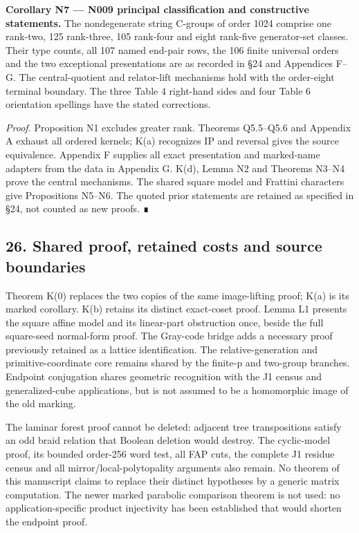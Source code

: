 \documentclass[
  10pt,
  letterpaper,
]{article}
\begin{document}
\textbf{Corollary N7 --- N009 principal classification and constructive
statements.} The nondegenerate string C-groups of order 1024 comprise
one rank-two, 125 rank-three, 105 rank-four and eight rank-five
generator-set classes. Their type counts, all 107 named end-pair rows,
the 106 finite universal orders and the two exceptional presentations
are as recorded in §24 and Appendices F--G. The central-quotient and
relator-lift mechanisms hold with the order-eight terminal boundary. The
three Table 4 right-hand sides and four Table 6 orientation spellings
have the stated corrections.

\emph{Proof.} Proposition N1 excludes greater rank. Theorems Q5.5--Q5.6
and Appendix A exhaust all ordered kernels; K(a) recognizes IP and
reversal gives the source equivalence. Appendix F supplies all exact
presentation and marked-name adapters from the data in Appendix G. K(d),
Lemma N2 and Theorems N3--N4 prove the central mechanisms. The shared
square model and Frattini characters give Propositions N5--N6. The
quoted prior statements are retained as specified in §24, not counted as
new proofs. ∎

\subsection{26. Shared proof, retained costs and source
boundaries}\label{shared-proof-retained-costs-and-source-boundaries}

Theorem K(0) replaces the two copies of the same image-lifting proof;
K(a) is its marked corollary. K(b) retains its distinct exact-coset
proof. Lemma L1 presents the square affine model and its linear-part
obstruction once, beside the full square-seed normal-form proof. The
Gray-code bridge adds a necessary proof previously retained as a lattice
identification. The relative-generation and primitive-coordinate core
remains shared by the finite-p and two-group branches. Endpoint
conjugation shares geometric recognition with the J1 census and
generalized-cube applications, but is not assumed to be a homomorphic
image of the old marking.

The laminar forest proof cannot be deleted: adjacent tree transpositions
satisfy an odd braid relation that Boolean deletion would destroy. The
cyclic-model proof, its bounded order-256 word test, all FAP cuts, the
complete J1 residue census and all mirror/local-polytopality arguments
also remain. No theorem of this manuscript claims to replace their
distinct hypotheses by a generic matrix computation. The newer marked
parabolic comparison theorem is not used: no application-specific
product injectivity has been established that would shorten the endpoint
proof.
\end{document}
